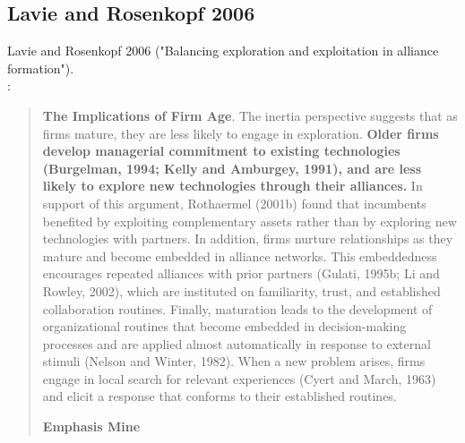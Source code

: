 \subsection{Lavie and Rosenkopf 2006}

Lavie and Rosenkopf 2006 \cite{lavie2006balancing} ("Balancing exploration and exploitation in alliance formation").\\

\cite[p.B2]{lavie2006balancing}:
\begin{quote}
\textbf{The Implications of Firm Age}.  The inertia perspective suggests that as firms mature, they are less likely to engage in exploration. \textbf{Older firms develop managerial commitment to existing technologies (Burgelman, 1994; Kelly and Amburgey, 1991), and are less likely to explore new technologies through their alliances.} In support of this argument, Rothaermel (2001b) found that incumbents benefited by exploiting complementary assets rather than by exploring new technologies with partners. In addition, firms nurture relationships as they mature and become embedded in alliance networks. This embeddedness encourages repeated alliances with prior partners (Gulati, 1995b; Li and Rowley, 2002), which are instituted on familiarity, trust, and established collaboration routines. Finally, maturation leads to the development of organizational routines that become embedded in decision-making processes and are applied almost automatically in response to external stimuli (Nelson and Winter, 1982). When a new problem arises, firms engage in local search for relevant experiences (Cyert and March, 1963) and elicit a response that conforms to their established routines.
\begin{flushright}
\textbf{Emphasis Mine}
\end{flushright}
\end{quote}

